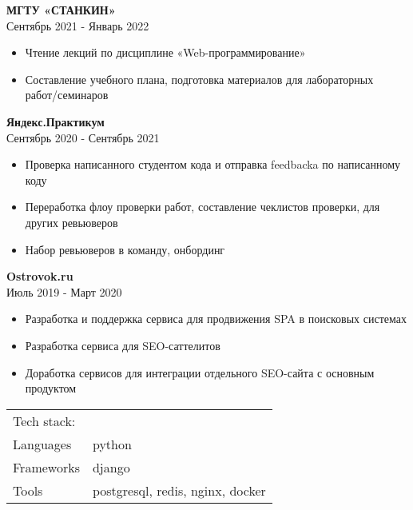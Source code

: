 \documentclass[a4paper]{article}
\begin{document}
\textbf{МГТУ «СТАНКИН»} \\
 \hfill Сентябрь 2021 - Январь 2022\\
\begin{itemize}[leftmargin=16pt,itemsep=0pt,topsep=0pt,label={-}]
    \item Чтение лекций по дисциплине «Web-программирование»
    \item Составление учебного плана, подготовка материалов для лабораторных работ/семинаров
\end{itemize}
\vspace{\baselineskip}

\textbf{Яндекс.Практикум} \\
 \hfill Сентябрь 2020 - Сентябрь 2021\\
\begin{itemize}[leftmargin=16pt,itemsep=0pt,topsep=0pt,label={-}]
    \item Проверка написанного студентом кода и отправка feedback\textquotesingle{}a по написанному коду
    \item Переработка флоу проверки работ, составление чеклистов проверки, для других ревьюверов
    \item Набор ревьюверов в команду, онбординг
\end{itemize}
\vspace{\baselineskip}

\textbf{Ostrovok.ru} \\
 \hfill Июль 2019 - Март 2020\\
\begin{itemize}[leftmargin=16pt,itemsep=0pt,topsep=-8pt,label={-}]
    \item Разработка и поддержка сервиса для продвижения SPA в поисковых системах
    \item Разработка сервиса для SEO-саттелитов
    \item Доработка сервисов для интеграции отдельного SEO-сайта с основным продуктом
\end{itemize}
\begin{table}[h!]
    \begin{tabular}{ l l }
        Tech stack:& \\
        Languages  & python \\
        Frameworks & django \\
        Tools      & postgresql, redis, nginx, docker \\
    \end{tabular}
\end{table}
\end{document}

